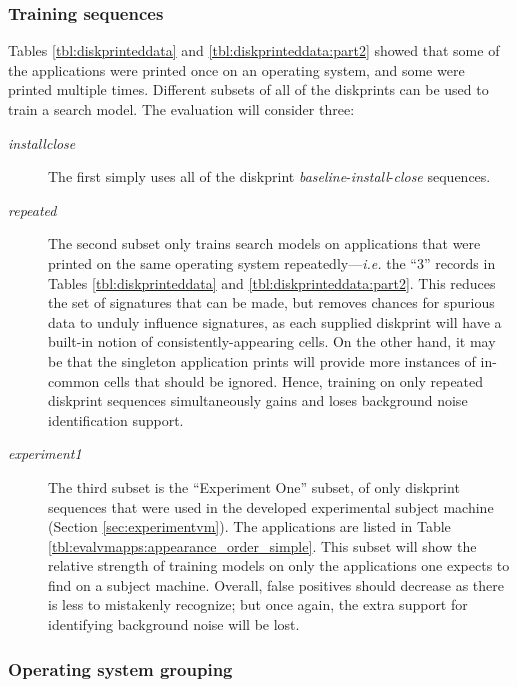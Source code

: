 \documentclass[11pt]{ucthesis}
\theoremstyle{plain}
\theoremstyle{definition}
\newcommand{\ie}{\emph{i.e.}\xspace}
\begin{document}
\subsubsection{Training sequences}
\label{sec:modelparameters:sequences}

Tables \ref{tbl:diskprinteddata} and \ref{tbl:diskprinteddata:part2} showed that some of the applications were printed once on an operating system, and some were printed multiple times.  Different subsets of all of the diskprints can be used to train a search model.  The evaluation will consider three:

\begin{description}
\item[\emph{installclose}] \par The first simply uses all of the diskprint \emph{baseline}-\emph{install}-\emph{close} sequences.
\item[\emph{repeated}] \par The second subset only trains search models on applications that were printed on the same operating system repeatedly---\ie the ``3'' records in Tables \ref{tbl:diskprinteddata} and \ref{tbl:diskprinteddata:part2}.  This reduces the set of signatures that can be made, but removes chances for spurious data to unduly influence signatures, as each supplied diskprint will have a built-in notion of consistently-appearing cells.  On the other hand, it may be that the singleton application prints will provide more instances of in-common cells that should be ignored.  Hence, training on only repeated diskprint sequences simultaneously gains and loses background noise identification support.
\item[\emph{experiment1}]\par The third subset is the ``Experiment One'' subset, of only diskprint sequences that were used in the developed experimental subject machine (Section \ref{sec:experimentvm}).  The applications are listed in Table \ref{tbl:evalvmapps:appearance_order_simple}.  This subset will show the relative strength of training models on only the applications one expects to find on a subject machine.  Overall, false positives should decrease as there is less to mistakenly recognize; but once again, the extra support for identifying background noise will be lost.
\end{description}


\subsubsection{Operating system grouping}
\label{sec:docsby}
\end{document}
